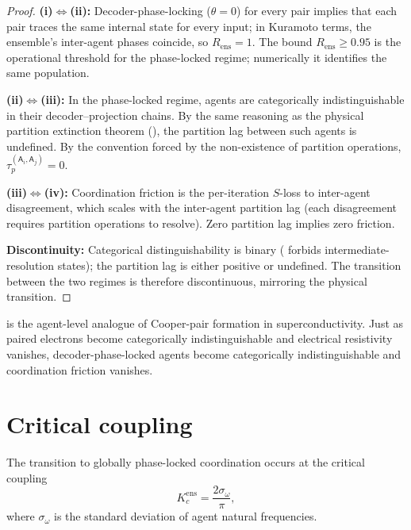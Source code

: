 \documentclass[11pt,twocolumn,a4paper]{article}
\newcommand{\agent}{\mathsf{A}}
\newcommand{\Kc}{K_c}
\newcommand{\tauP}{\tau_p}
\newcommand{\Ord}{R}
\begin{document}
\begin{proof}
\textbf{(i)$\Leftrightarrow$(ii):} Decoder-phase-locking
($\theta=0$) for every pair implies that each pair traces the same
internal state for every input; in Kuramoto terms, the ensemble's
inter-agent phases coincide, so $\Ord_{\mathrm{ens}}=1$. The bound
$\Ord_{\mathrm{ens}}\ge 0.95$ is the operational threshold for the
phase-locked regime; numerically it identifies the same population.

\textbf{(ii)$\Leftrightarrow$(iii):} In the phase-locked regime,
agents are categorically indistinguishable in their decoder--projection
chains. By the same reasoning as the physical partition extinction
theorem (), the partition lag between such agents is
undefined. By the convention forced by the non-existence of partition
operations, $\tauP^{(\agent_i,\agent_j)}=0$.

\textbf{(iii)$\Leftrightarrow$(iv):} Coordination friction is the
per-iteration $S$-loss to inter-agent disagreement, which scales with
the inter-agent partition lag (each disagreement requires partition
operations to resolve). Zero partition lag implies zero friction.

\textbf{Discontinuity:} Categorical distinguishability is binary
( forbids intermediate-resolution states); the
partition lag is either positive or undefined. The transition between
the two regimes is therefore discontinuous, mirroring the physical
transition.
\end{proof}

\begin{remark}\label{rem:cooper-pair}
 is the agent-level analogue of Cooper-pair formation
in superconductivity. Just as paired electrons become categorically
indistinguishable and electrical resistivity vanishes, decoder-phase-locked
agents become categorically indistinguishable and coordination
friction vanishes.
\end{remark}

\section{Critical coupling}
\label{sec:critical-coupling}

\begin{theorem}\label{thm:critical-coupling}
The transition to globally phase-locked coordination occurs at the
critical coupling
\[
\Kc^{\mathrm{ens}}=\frac{2\sigma_\omega}{\pi},
\]
where $\sigma_\omega$ is the standard deviation of agent natural
frequencies.
\end{theorem}
\end{document}
